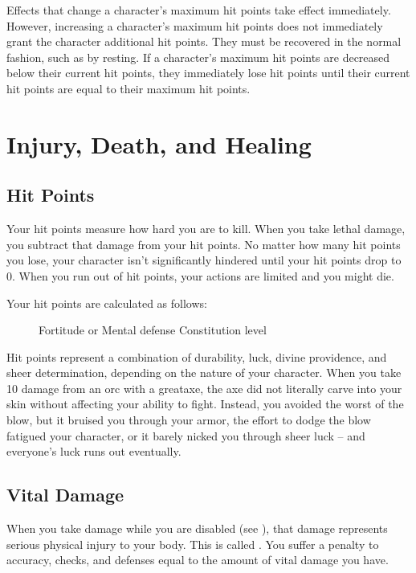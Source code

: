          Effects that change a character's maximum hit points take effect immediately.
        However, increasing a character's maximum hit points does not immediately grant the character additional hit points.
        They must be recovered in the normal fashion, such as by resting.
        If a character's maximum hit points are decreased below their current hit points, they immediately lose hit points until their current hit points are equal to their maximum hit points.

\section{Injury, Death, and Healing}\label{Injury, Death, and Healing}

    \subsection{Hit Points}\label{Hit Points}
        Your hit points measure how hard you are to kill.
        When you take lethal damage, you subtract that damage from your hit points.
        No matter how many hit points you lose, your character isn't significantly hindered until your hit points drop to 0.
        When you run out of hit points, your actions are limited and you might die.

        Your hit points are calculated as follows:

        \begin{figure}[h]
            \centering Fortitude or Mental defense \add Constitution  \x level
        \end{figure}

         Hit points represent a combination of durability, luck, divine providence, and sheer determination, depending on the nature of your character.
        When you take 10 damage from an orc with a greataxe, the axe did not literally carve into your skin without affecting your ability to fight.
        Instead, you avoided the worst of the blow, but it bruised you through your armor, the effort to dodge the blow fatigued your character, or it barely nicked you through sheer luck -- and everyone's luck runs out eventually.

    \subsection{Vital Damage}\label{Vital Damage}
        When you take damage while you are disabled (see ), that damage represents serious physical injury to your body.
        This is called .
        You suffer a penalty to accuracy, checks, and defenses equal to the amount of vital damage you have.

